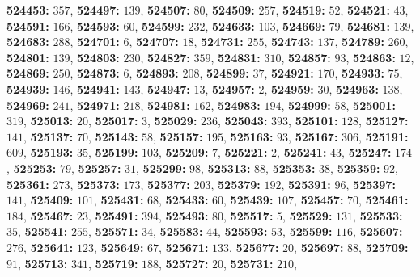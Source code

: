 \textsf{\bfseries 524453:} $357$, \textsf{\bfseries 524497:} $139$, \textsf{\bfseries 524507:} $80$, \textsf{\bfseries 524509:} $257$, \textsf{\bfseries 524519:} $52$, \textsf{\bfseries 524521:} $43$, \textsf{\bfseries 524591:} $166$, \textsf{\bfseries 524593:} $60$, \textsf{\bfseries 524599:} $232$, \textsf{\bfseries 524633:} $103$, \textsf{\bfseries 524669:} $79$, \textsf{\bfseries 524681:} $139$, \textsf{\bfseries 524683:} $288$, \textsf{\bfseries 524701:} $6$, \textsf{\bfseries 524707:} $18$, \textsf{\bfseries 524731:} $255$, \textsf{\bfseries 524743:} $137$, \textsf{\bfseries 524789:} $260$, \textsf{\bfseries 524801:} $139$, \textsf{\bfseries 524803:} $230$, \textsf{\bfseries 524827:} $359$, \textsf{\bfseries 524831:} $310$, \textsf{\bfseries 524857:} $93$, \textsf{\bfseries 524863:} $12$, \textsf{\bfseries 524869:} $250$, \textsf{\bfseries 524873:} $6$, \textsf{\bfseries 524893:} $208$, \textsf{\bfseries 524899:} $37$, \textsf{\bfseries 524921:} $170$, \textsf{\bfseries 524933:} $75$, \textsf{\bfseries 524939:} $146$, \textsf{\bfseries 524941:} $143$, \textsf{\bfseries 524947:} $13$, \textsf{\bfseries 524957:} $2$, \textsf{\bfseries 524959:} $30$, \textsf{\bfseries 524963:} $138$, \textsf{\bfseries 524969:} $241$, \textsf{\bfseries 524971:} $218$, \textsf{\bfseries 524981:} $162$, \textsf{\bfseries 524983:} $194$, \textsf{\bfseries 524999:} $58$, \textsf{\bfseries 525001:} $319$, \textsf{\bfseries 525013:} $20$, \textsf{\bfseries 525017:} $3$, \textsf{\bfseries 525029:} $236$, \textsf{\bfseries 525043:} $393$, \textsf{\bfseries 525101:} $128$, \textsf{\bfseries 525127:} $141$, \textsf{\bfseries 525137:} $70$, \textsf{\bfseries 525143:} $58$, \textsf{\bfseries 525157:} $195$, \textsf{\bfseries 525163:} $93$, \textsf{\bfseries 525167:} $306$, \textsf{\bfseries 525191:} $609$, \textsf{\bfseries 525193:} $35$, \textsf{\bfseries 525199:} $103$, \textsf{\bfseries 525209:} $7$, \textsf{\bfseries 525221:} $2$, \textsf{\bfseries 525241:} $43$, \textsf{\bfseries 525247:} $174$, \textsf{\bfseries 525253:} $79$, \textsf{\bfseries 525257:} $31$, \textsf{\bfseries 525299:} $98$, \textsf{\bfseries 525313:} $88$, \textsf{\bfseries 525353:} $38$, \textsf{\bfseries 525359:} $92$, \textsf{\bfseries 525361:} $273$, \textsf{\bfseries 525373:} $173$, \textsf{\bfseries 525377:} $203$, \textsf{\bfseries 525379:} $192$, \textsf{\bfseries 525391:} $96$, \textsf{\bfseries 525397:} $141$, \textsf{\bfseries 525409:} $101$, \textsf{\bfseries 525431:} $68$, \textsf{\bfseries 525433:} $60$, \textsf{\bfseries 525439:} $107$, \textsf{\bfseries 525457:} $70$, \textsf{\bfseries 525461:} $184$, \textsf{\bfseries 525467:} $23$, \textsf{\bfseries 525491:} $394$, \textsf{\bfseries 525493:} $80$, \textsf{\bfseries 525517:} $5$, \textsf{\bfseries 525529:} $131$, \textsf{\bfseries 525533:} $35$, \textsf{\bfseries 525541:} $255$, \textsf{\bfseries 525571:} $34$, \textsf{\bfseries 525583:} $44$, \textsf{\bfseries 525593:} $53$, \textsf{\bfseries 525599:} $116$, \textsf{\bfseries 525607:} $276$, \textsf{\bfseries 525641:} $123$, \textsf{\bfseries 525649:} $67$, \textsf{\bfseries 525671:} $133$, \textsf{\bfseries 525677:} $20$, \textsf{\bfseries 525697:} $88$, \textsf{\bfseries 525709:} $91$, \textsf{\bfseries 525713:} $341$, \textsf{\bfseries 525719:} $188$, \textsf{\bfseries 525727:} $20$, \textsf{\bfseries 525731:} $210$, 
